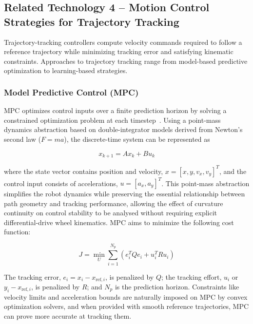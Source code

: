 \subsection{Related Technology 4 -- Motion Control Strategies for Trajectory Tracking}

Trajectory-tracking controllers compute velocity commands required to follow a reference trajectory while minimizing tracking error and satisfying kinematic constraints. Approaches to trajectory tracking range from model-based predictive optimization to learning-based strategies.

\subsubsection{Model Predictive Control (MPC)}

MPC optimizes control inputs over a finite prediction horizon by solving a constrained optimization problem at each timestep~\cite{faulwasser2009mpc}. Using a point-mass dynamics abstraction based on double-integrator models derived from Newton's second law ($F = ma$), the discrete-time system can be represented as

\begin{equation}
	x_{k+1} = A x_k + B u_k
\end{equation}

where the state vector contains position and velocity, $x = [x, y, v_x, v_y]^T$, and the control input consists of accelerations, $u = [a_x, a_y]^T$. This point-mass abstraction simplifies the robot dynamics while preserving the essential relationship between path geometry and tracking performance, allowing the effect of curvature continuity on control stability to be analysed without requiring explicit differential-drive wheel kinematics. MPC aims to minimize the following cost function:

\begin{equation}
	J = \min_{U} \sum_{i=1}^{N_p} \left( e_i^T Q e_i + u_i^T R u_i \right)
\end{equation}

The tracking error, $e_i = x_i - x_{\text{ref},i}$, is penalized by $Q$; the tracking effort, $u_i$ or $y_i - x_{\text{ref},i}$, is penalized by $R$; and $N_p$ is the prediction horizon. Constraints like velocity limits and acceleration bounds are naturally imposed on MPC by convex optimization solvers, and when provided with smooth reference trajectories, MPC can prove more accurate at tracking them.

